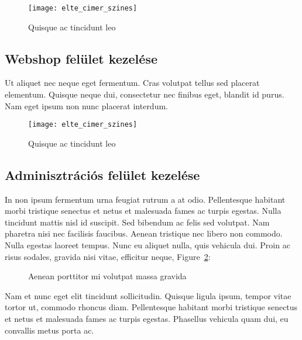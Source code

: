 \begin{figure}[H]
	\centering
	\texttt{[image: elte\_cimer\_szines]}
	\caption{Quisque ac tincidunt leo}
	\label{fig:example-1}
\end{figure}

\subsection{Webshop felület kezelése} %

Ut aliquet nec neque eget fermentum. Cras volutpat tellus sed placerat elementum. Quisque neque dui, consectetur nec finibus eget, blandit id purus. Nam eget ipsum non nunc placerat interdum.

\begin{figure}[H]
	\centering
	\texttt{[image: elte\_cimer\_szines]}
	\caption{Quisque ac tincidunt leo}
\end{figure}

\subsection{Adminisztrációs felület kezelése} %

In non ipsum fermentum urna feugiat rutrum a at odio. Pellentesque habitant morbi tristique senectus et netus et malesuada fames ac turpis egestas. Nulla tincidunt mattis nisl id suscipit. Sed bibendum ac felis sed volutpat. Nam pharetra nisi nec facilisis faucibus. Aenean tristique nec libero non commodo. Nulla egestas laoreet tempus. Nunc eu aliquet nulla, quis vehicula dui. Proin ac risus sodales, gravida nisi vitae, efficitur neque, Figure~\ref{fig:example-2}:

\begin{figure}[H]
	\centering
	\hspace{5pt}
	\caption{Aenean porttitor mi volutpat massa gravida}
	\label{fig:example-2}
\end{figure}

Nam et nunc eget elit tincidunt sollicitudin. Quisque ligula ipsum, tempor vitae tortor ut, commodo rhoncus diam. Pellentesque habitant morbi tristique senectus et netus et malesuada fames ac turpis egestas. Phasellus vehicula quam dui, eu convallis metus porta ac.


